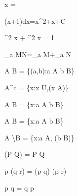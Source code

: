 x = 

\int (x+1)dx=x^2+x+C


\sin^2 x + \cos^2 x = 1

\log_a  MN=\log_a M+\log_a N

A \times B = \{(a,b):a \in A \wedge b \in B\}

A^c = \{x:x \in U,\neg (x \in A)\}

A \cup B = \{x:a \in A \vee b \in B\}

A \cap B = \{x:a \in A \wedge b \in B\}

A \backslash B = \{x:a \in A, \neg(b \in B)\}

\neg (P \vee Q) = \nge P \wedge \neg Q

p \vee (q \wedge r) = (p \vee q) \wedge (p \vee r)

p \vee q = q \vee p